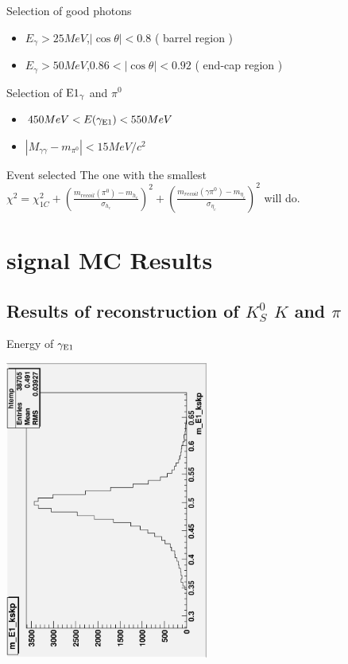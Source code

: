 \documentclass{beamer}
\begin{document}
\begin{frame}{}
\begin{block}{Selection of good photons}
\begin{itemize}
\item $E_{\gamma}>25 MeV$,$|\cos\theta|<0.8$ ( barrel region )
\item $E_{\gamma}>50 MeV$,$0.86<|\cos\theta|<0.92$ ( end-cap region )
\end{itemize}
\end{block}
\begin{block}{Selection of ${\rm E1}_{\gamma}$ and ${\pi}^0$}
\begin{itemize}
\item $450MeV < E({\gamma}_{{\rm E1}}) < 550MeV$
\item $|M_{\gamma \gamma}-m_{{\pi}^0}| < 15 MeV/c^2$
\end{itemize}
\end{block}
\begin{block}{Event selected}
The one with the smallest ${\chi}^2 = {\chi}_{1C}^2 + {(\frac{m_{recoil}({\pi}^0)-m_{h_c}}{{\sigma}_{h_c}})}^2 + (\frac{m_{recoil}(\gamma {\pi}^0)-m_{{\eta}_c}}{{\sigma}_{{\eta}_c}})^2$ will do.
\end{block}
\end{frame}

\section{signal MC Results}
\subsection{Results of reconstruction of $K_S^0$ $K$ and $\pi$}
\begin{frame}{Energy of ${\gamma}_{\rm E1}$}
\begin{center}
\includegraphics[width=0.5\textwidth,angle=270]{figures/m_E1_kskp.eps}
\end{center}
\end{frame}
\end{document}
